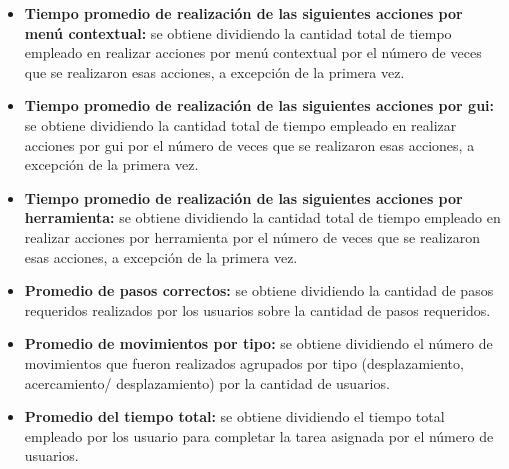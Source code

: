 \begin{itemize}
    
\item \textbf{Tiempo promedio de realización de las siguientes acciones por menú contextual:} 
    se obtiene dividiendo la cantidad total de tiempo empleado en realizar acciones por menú 
    contextual por el número de veces que se realizaron esas acciones, a excepción de la primera 
    vez. 
    
\item \textbf{Tiempo promedio de realización de las siguientes acciones por \Gls{gui}:} 
    se obtiene dividiendo la cantidad total de tiempo empleado en realizar acciones por \Gls{gui} 
    por el número de veces que se realizaron esas acciones, a excepción de la primera 
    vez. 
    
\item \textbf{Tiempo promedio de realización de las siguientes acciones por herramienta:} 
    se obtiene dividiendo la cantidad total de tiempo empleado en realizar acciones por 
    herramienta por el número de veces que se realizaron esas acciones, a excepción de la 
    primera vez. 
    
\item \textbf{Promedio de pasos correctos:} se obtiene dividiendo la cantidad de 
    pasos requeridos realizados por los usuarios sobre la cantidad de pasos requeridos. 
    
\item \textbf{Promedio de movimientos por tipo:} se obtiene dividiendo el número de 
    movimientos que fueron realizados agrupados por tipo (desplazamiento, acercamiento/
    desplazamiento) por la cantidad de usuarios.
    
\item \textbf{Promedio del tiempo total:} se obtiene dividiendo el tiempo total empleado 
    por los usuario para completar la tarea asignada por el número de usuarios.

\end{itemize}

